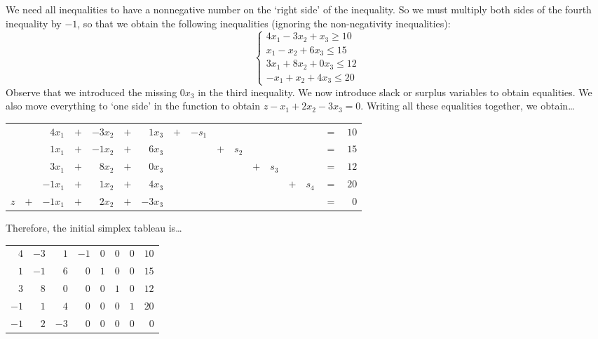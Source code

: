 \documentclass[12pt,letterpaper]{exam}
\begin{document}
\begin{questions}
\sol We need all inequalities to have a nonnegative number on the `right side' of the inequality. So we must multiply both sides of the fourth inequality by $-1$, so that we obtain the following inequalities (ignoring the non-negativity inequalities): 
	\[
	\begin{cases}
	4x_1 - 3x_2 + x_3 \geq 10 \\
	x_1 - x_2 + 6x_3 \leq 15 \\
	3x_1 + 8x_2 + 0x_3 \leq 12 \\
	-x_1 + x_2 + 4x_3 \leq 20 
	\end{cases}
	\]
Observe that we introduced the missing $0x_3$ in the third inequality. We now introduce slack or surplus variables to obtain equalities. We also move everything to `one side' in the function to obtain $z - x_1 + 2x_2 - 3x_3= 0$. Writing all these equalities together, we obtain\dots \par
	\begin{table}[H]
	\centering
	\begin{tabular}{rrrrrrrrrrrrrrrrr}
	&& $4x_1$ & $+$ & $-3x_2$ & $+$ & $1x_3$ & $+$ & $-s_1$ & & & & & & & $=$ & $10$ \\
	&& $1x_1$ & $+$ & $-1x_2$ & $+$ & $6x_3$ & & & $+$ & $s_2$ & & & & & $=$ & $15$ \\
	&& $3x_1$ & $+$ & $8x_2$ & $+$ & $0x_3$ & & & & & $+$ & $s_3$ & & & $=$ & $12$ \\
	&& $-1x_1$ & $+$ & $1x_2$ & $+$ & $4x_3$ & & & & & & & $+$ & $s_4$ & $=$ & $20$ \\
	$z$ & $+$ & $-1x_1$ & $+$ & $2x_2$ & $+$ & $-3x_3$ & & & & & & & & & $=$ & $0$
	\end{tabular}
	\end{table} \par
Therefore, the initial simplex tableau is\dots \par
	\begin{table}[H]
	\centering
	\begin{tabular}{rrrrrrr|r}
	$4$ & $-3$ & $1$ & $-1$ & $0$ & $0$ & $0$ & $10$ \\
	$1$ & $-1$ & $6$ & $0$ & $1$ & $0$ & $0$ & $15$ \\
	$3$ & $8$ & $0$ & $0$ & $0$ & $1$ & $0$ & $12$ \\
	$-1$ & $1$ & $4$ & $0$ & $0$ & $0$ & $1$ & $20$ \\ \hline
	$-1$ & $2$ & $-3$ & $0$ & $0$ & $0$ & $0$ & $0$ 
	\end{tabular}
	\end{table}
	

\end{questions}
\end{document}
